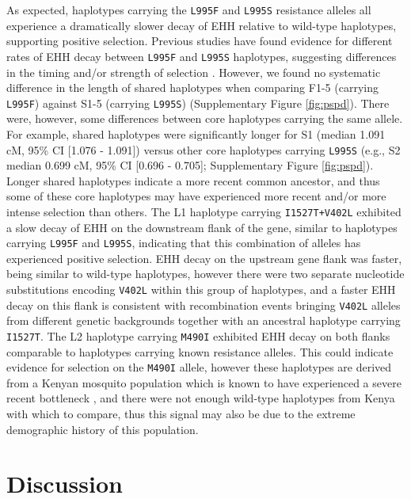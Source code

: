 \documentclass[a4paper,11pt,abstracton,hidelinks]{scrartcl}
\begin{document}
%
As expected, haplotypes carrying the \texttt{L995F} and \texttt{L995S} resistance alleles all experience a dramatically slower decay of EHH relative to wild-type haplotypes, supporting positive selection.
%
Previous studies have found evidence for different rates of EHH decay between \texttt{L995F} and \texttt{L995S} haplotypes,
suggesting differences in the timing and/or strength of selection \cite{Lynd2010}.
%
However, we found no systematic difference in the length of shared haplotypes when comparing F1-5 (carrying \texttt{L995F}) against S1-5 (carrying \texttt{L995S}) (Supplementary Figure \ref{fig:pspd}).
%
There were, however, some differences between core haplotypes carrying the same allele.
%
For example, shared haplotypes were significantly longer for S1 (median 1.091 cM, 95\% CI [1.076 - 1.091]) versus other core haplotypes carrying \texttt{L995S} (e.g., S2 median 0.699 cM, 95\% CI [0.696 - 0.705]; Supplementary Figure \ref{fig:pspd}).
%
Longer shared haplotypes indicate a more recent common ancestor, and thus some of these core haplotypes may have experienced more recent and/or more intense selection than others.
%
The L1 haplotype carrying \texttt{I1527T+V402L} exhibited a slow decay of EHH on the downstream flank of the gene, similar to haplotypes carrying \texttt{L995F} and \texttt{L995S}, indicating that this combination of alleles has experienced positive selection.
%
EHH decay on the upstream gene flank was faster, being similar to wild-type haplotypes, however there were two separate nucleotide substitutions encoding \texttt{V402L} within this group of haplotypes, and a faster EHH decay on this flank is consistent with recombination events bringing \texttt{V402L} alleles from different genetic backgrounds together with an ancestral haplotype carrying \texttt{I1527T}.
%
The L2 haplotype carrying \texttt{M490I} exhibited EHH decay on both flanks comparable to haplotypes carrying known resistance alleles.
%
This could indicate evidence for selection on the \texttt{M490I} allele, however these haplotypes are derived from a Kenyan mosquito population which is known to have experienced a severe recent bottleneck \cite{Ag1000gConsortium2017}, and there were not enough wild-type haplotypes from Kenya with which to compare, thus this signal may also be due to the extreme demographic history of this population.


\section*{Discussion}
\end{document}
